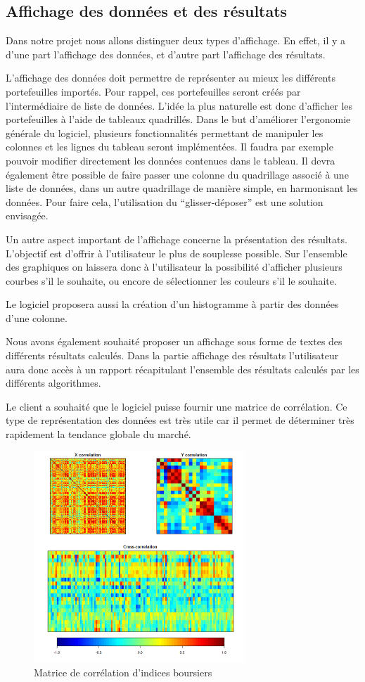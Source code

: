 	\subsection{Affichage des données et des résultats} 
		Dans notre projet nous allons distinguer deux types d’affichage. En effet, il y a d’une part l’affichage des données, et d’autre part l’affichage des résultats.

		L’affichage des données doit permettre de représenter au mieux les différents portefeuilles importés. Pour rappel, ces portefeuilles seront créés par l’intermédiaire de liste de données. L’idée la plus naturelle est donc d’afficher les portefeuilles à l’aide de tableaux quadrillés. Dans le but d’améliorer l’ergonomie générale du logiciel, plusieurs fonctionnalités permettant de manipuler les colonnes et les lignes du tableau seront implémentées. Il faudra par exemple pouvoir modifier directement les données contenues dans le tableau. Il devra également être possible de faire passer une colonne du quadrillage associé à une liste de données, dans un autre quadrillage de manière simple, en harmonisant les données. Pour faire cela, l’utilisation du “glisser-déposer” est une solution envisagée.

		Un autre aspect important de l’affichage concerne la présentation des résultats. L’objectif est d’offrir à l’utilisateur le plus de souplesse possible. Sur l’ensemble des graphiques on laissera donc à l’utilisateur la possibilité d’afficher plusieurs courbes s’il le souhaite, ou encore de sélectionner les couleurs s’il le souhaite.

		Le logiciel proposera aussi la création d’un histogramme à partir des données d’une colonne.

		Nous avons également souhaité proposer un affichage sous forme de textes des différents résultats calculés. Dans la partie affichage des résultats l’utilisateur aura donc accès à un rapport récapitulant l’ensemble des résultats calculés par les différents algorithmes.

		Le client a souhaité que le logiciel puisse fournir une matrice de corrélation. Ce type de représentation des données est très utile car il permet de déterminer très rapidement la tendance globale du marché.

		\begin{figure}[h]
			\center
			\includegraphics[width=300px]{matrice.png}
			\caption{Matrice de corrélation d'indices boursiers}
		\end{figure}


